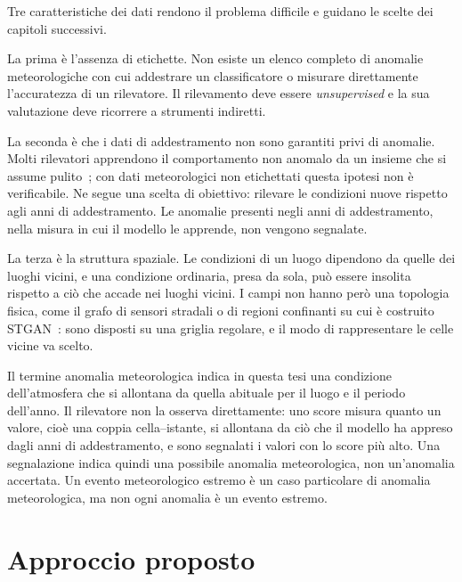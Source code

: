 Tre caratteristiche dei dati rendono il problema difficile e guidano le scelte dei capitoli successivi.

La prima è l'assenza di etichette. Non esiste un elenco completo di anomalie meteorologiche con cui addestrare un classificatore o misurare direttamente l'accuratezza di un rilevatore. Il rilevamento deve essere \emph{unsupervised} e la sua valutazione deve ricorrere a strumenti indiretti.

La seconda è che i dati di addestramento non sono garantiti privi di anomalie. Molti rilevatori apprendono il comportamento non anomalo da un insieme che si assume pulito~\cite{zhou2023labelfree}; con dati meteorologici non etichettati questa ipotesi non è verificabile. Ne segue una scelta di obiettivo: rilevare le condizioni nuove rispetto agli anni di addestramento. Le anomalie presenti negli anni di addestramento, nella misura in cui il modello le apprende, non vengono segnalate.

La terza è la struttura spaziale. Le condizioni di un luogo dipendono da quelle dei luoghi vicini, e una condizione ordinaria, presa da sola, può essere insolita rispetto a ciò che accade nei luoghi vicini. I campi non hanno però una topologia fisica, come il grafo di sensori stradali o di regioni confinanti su cui è costruito STGAN~\cite{deng2022stgan}: sono disposti su una griglia regolare, e il modo di rappresentare le celle vicine va scelto.

Il termine anomalia meteorologica indica in questa tesi una condizione dell'atmosfera che si allontana da quella abituale per il luogo e il periodo dell'anno. Il rilevatore non la osserva direttamente: uno score misura quanto un valore, cioè una coppia cella--istante, si allontana da ciò che il modello ha appreso dagli anni di addestramento, e sono segnalati i valori con lo score più alto. Una segnalazione indica quindi una possibile anomalia meteorologica, non un'anomalia accertata. Un evento meteorologico estremo è un caso particolare di anomalia meteorologica, ma non ogni anomalia è un evento estremo.

\section{Approccio proposto}
\label{sec:intro-approccio}

